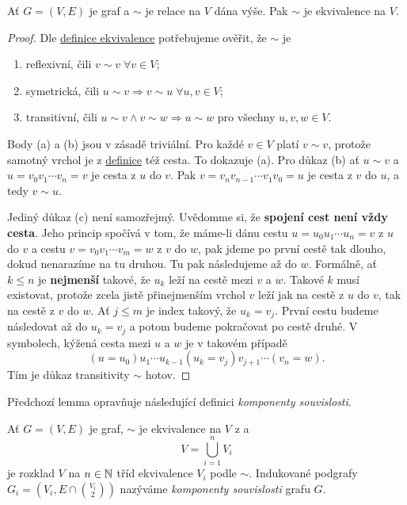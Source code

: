\begin{lemma}
 \label{lem:cesta-ekvivalence}
 Ať $G = (V,E)$ je graf a $ \sim $ je relace na $V$ dána výše. Pak $ \sim $ je
 ekvivalence na $V$.
\end{lemma}
\begin{proof}
 Dle \hyperref[def:ekvivalence]{definice ekvivalence} potřebujeme ověřit, že $
 \sim $ je
 \begin{enumerate}[label=(\alph*)]
  \item reflexivní, čili $v \sim v \; \forall v \in V$;
  \item symetrická, čili $u \sim v \Rightarrow v \sim u \; \forall u,v \in
   V$;
  \item transitivní, čili $u \sim v \wedge v \sim w \Rightarrow u \sim w$ pro
   všechny $u,v,w \in V$.
 \end{enumerate}
 Body (a) a (b) jsou v zásadě triviální. Pro každé $v \in V$ platí $v \sim v$,
 protože samotný vrchol je z \hyperref[def:cesta]{definice} též cesta. To
 dokazuje (a). Pro důkaz (b) ať $u \sim v$ a $u=v_0v_1\cdots v_n=v$ je cesta z
 $u$ do $v$. Pak $v=v_nv_{n-1}\cdots v_1v_0=u$ je cesta z $v$ do $u$, a tedy
 $v \sim u$.

 Jediný důkaz (c) není samozřejmý. Uvědomme si, že \textbf{spojení cest není
 vždy cesta}. Jeho princip spočívá v tom, že máme-li dánu cestu $u=u_0u_1\cdots
 u_n=v$ z $u$ do $v$ a cestu $v=v_0v_1\cdots v_m=w$ z $v$ do $w$, pak jdeme po
 první cestě tak dlouho, dokud nenarazíme na tu druhou. Tu pak následujeme až do
 $w$. Formálně, ať $k \leq n$ je \textbf{nejmenší} takové, že $u_k$ leží na
 cestě mezi $v$ a $w$. Takové $k$ musí existovat, protože zcela jistě
 přinejmenším vrchol $v$ leží jak na cestě z $u$ do $v$, tak na cestě z $v$ do
 $w$. Ať $j \leq m$ je index takový, že $u_k = v_j$. První cestu budeme
 následovat až do $u_k = v_j$ a potom budeme pokračovat po cestě druhé. V
 symbolech, kýžená cesta mezi $u$ a $w$ je v takovém případě
 \[
  (u=u_0)u_1\cdots u_{k-1}(u_k=v_j)v_{j+1}\cdots (v_n=w).
 \]
 Tím je důkaz transitivity $ \sim $ hotov.
\end{proof}

Předchozí lemma opravňuje následující definici \emph{komponenty souvislosti}.

\begin{definition}
 \label{def:komponenta-souvislosti}
 Ať $G = (V,E)$ je graf, $ \sim $ je ekvivalence na $V$ z
  a 
 \[
  V = \bigcup_{i = 1}^{n} V_i
 \]
 je rozklad $V$ na $n \in \mathbb{N}$ tříd ekvivalence $V_i$ podle $ \sim $. Indukované
 podgrafy $G_i = (V_i, E \cap \binom{V_i}{2})$ nazýváme \emph{komponenty
 souvislosti} grafu $G$.
\end{definition}

